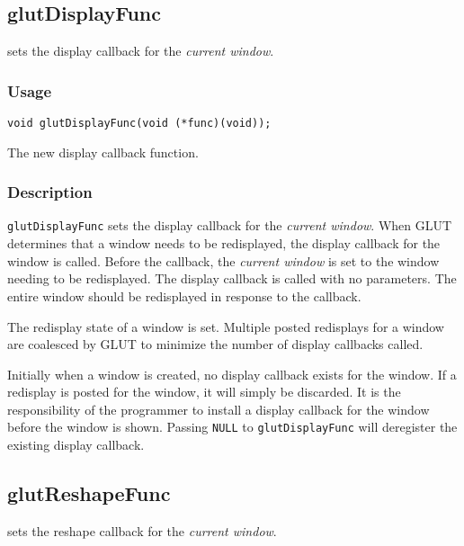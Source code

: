 \subsection{glutDisplayFunc}

 sets the display callback for the {\em current window}.

\subsubsection*{Usage}

\begin{verbatim}
void glutDisplayFunc(void (*func)(void));
\end{verbatim}
\begin{description}
\itemsep 0in
\item[\tt func]
The new display callback function.
\end{description}

\subsubsection*{Description}

{\tt glutDisplayFunc} sets the display callback for the {\em current window}.
When GLUT determines that a window needs to be redisplayed, the display callback for the window
is called.  Before the callback, the {\em current window} is
set to the window needing to be redisplayed.  The display callback is
called with no parameters.  The entire window should be redisplayed
in response to the callback.

The redisplay state of a window is set.  Multiple posted redisplays
for a window are coalesced by GLUT to minimize the number of display
callbacks called.

Initially when a window is created, no display callback exists for
the window.  If a redisplay is posted for the window, it will simply
be discarded.  It is the responsibility of the programmer to install
a display callback for the window before the window is shown.  Passing {\tt NULL} to
{\tt glutDisplayFunc} will deregister the existing display callback.

\subsection{glutReshapeFunc}

 sets the reshape callback for the {\em current window}.

